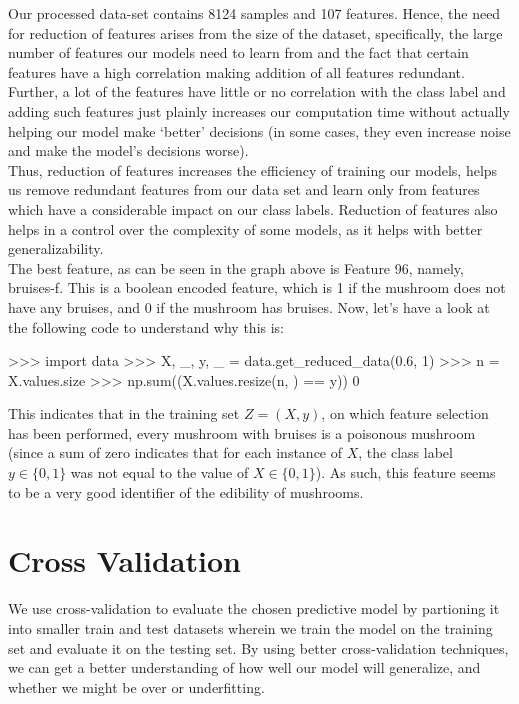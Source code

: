 \documentclass[fleqn]{article}
\begin{document}
    Our processed data-set contains 8124 samples and 107 features. Hence, the need for
    reduction of features arises from the size of the dataset, specifically, the large
    number of features our models need to learn from and the fact that certain features
    have a high correlation making addition of all features redundant. Further, a lot of
    the features have little or no correlation with the class label and
    adding such features just plainly increases our computation time without actually
    helping our model make ‘better’ decisions (in some cases, they even increase noise and
    make the model's decisions worse).\\

    Thus, reduction of features increases the efficiency
    of training our models, helps us remove redundant features from our data set and
    learn only from features which have a considerable impact on our class labels.
    Reduction of features also helps in a control over the complexity of some models, as it
    helps with better generalizability.\\

    The best feature, as can be seen in the graph above is Feature 96, namely,
    bruises-f. This is a boolean encoded feature, which is 1 if the mushroom does not have
    any bruises, and 0 if the mushroom has bruises. Now, let's have a look at the following
    code to understand why this is:
    \begin{python}
    >>> import data
    >>> X, _, y, _ = data.get_reduced_data(0.6, 1)
    >>> n = X.values.size
    >>>  np.sum((X.values.resize(n, ) == y))
    0
    \end{python}
    This indicates that in the training set $ Z = (X, y) $, on which feature selection has
    been performed, every mushroom with bruises is a poisonous mushroom (since a sum of
    zero indicates that for each instance of $ X $, the class label $ y\in\{0, 1\} $ was
    not equal to the value of $ X\in\{0, 1\} $). As such, this feature seems to be a very
    good identifier of the edibility of mushrooms.

    \section{Cross Validation}
    We use cross-validation to evaluate the chosen predictive model by partioning it into
    smaller train and test datasets wherein we train the model on the training set and
    evaluate it on the testing set. By using better cross-validation techniques, we can
    get a better understanding of how well our model will generalize, and whether we might
    be over or underfitting.\\
\end{document}
